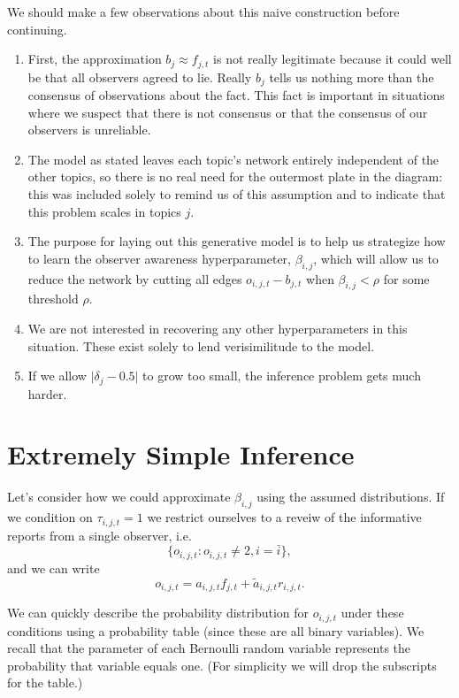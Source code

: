 \documentclass[11pt]{article}
\providecommand{\tightlist}{%
      \setlength{\itemsep}{0pt}\setlength{\parskip}{0pt}}
\begin{document}
    We should make a few observations about this naive construction before
continuing.

\begin{enumerate}
\def\labelenumi{\arabic{enumi}.}
\tightlist
\item
  First, the approximation \(b_j \approx f_{j,t}\) is not really
  legitimate because it could well be that all observers agreed to lie.
  Really \(b_j\) tells us nothing more than the consensus of
  observations about the fact. This fact is important in situations
  where we suspect that there is not consensus or that the consensus of
  our observers is unreliable.
\item
  The model as stated leaves each topic's network entirely independent
  of the other topics, so there is no real need for the outermost plate
  in the diagram: this was included solely to remind us of this
  assumption and to indicate that this problem scales in topics \(j\).
\item
  The purpose for laying out this generative model is to help us
  strategize how to learn the observer awareness hyperparameter,
  \(\beta_{i,j}\), which will allow us to reduce the network by cutting
  all edges \(o_{i,j,t} - b_{j,t}\) when \(\beta_{i,j} < \rho\) for some
  threshold \(\rho\).
\item
  We are not interested in recovering any other hyperparameters in this
  situation. These exist solely to lend verisimilitude to the model.
\item
  If we allow \(\lvert\delta_j-0.5\rvert\) to grow too small, the
  inference problem gets much harder.
\end{enumerate}

    \hypertarget{extremely-simple-inference}{%
\section{Extremely Simple Inference}\label{extremely-simple-inference}}

Let's consider how we could approximate \(\beta_{i,j}\) using the
assumed distributions. If we condition on \(\tau_{i,j,t}=1\) we restrict
ourselves to a reveiw of the informative reports from a single observer,
i.e.~\[\{ o_{i,j,t}: o_{i,j,t}\neq 2, i=\bar{i} \},\] and we can write
\[ o_{i,j,t} = a_{i,j,t} f_{j,t} + \tilde{a}_{i,j,t} r_{i,j,t}.\]

We can quickly describe the probability distribution for \(o_{i,j,t}\)
under these conditions using a probability table (since these are all
binary variables). We recall that the parameter of each Bernoulli random
variable represents the probability that variable equals one. (For
simplicity we will drop the subscripts for the table.)
\end{document}
